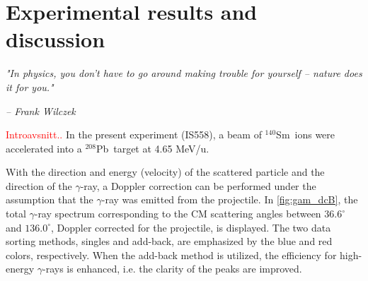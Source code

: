 \documentclass[twoside,english]{uiofysmaster/uiofysmaster}
\newcommand{\Sm}{$^{140}$Sm} %
\newcommand{\Pb}{$^{208}$Pb}
\newcommand{\ga}{$\gamma$}
\let\orgautoref\autoref
\renewcommand{\autoref}
        {%
		 \def\sectionautorefname{Section}%
		 \def\subsectionautorefname{Section}%
		 \def\subsubsectionautorefname{Section}%
		 \def\chapterautorefname{Chapter}%
          \orgautoref}
\begin{document}
%		
%		




\chapter{Experimental results and discussion}\label{ch:results}
\epigraph{\textit{"In physics, you don't have to go around making trouble for yourself – nature does it for you."}}{\textit{– Frank Wilczek}}


\textcolor{red}{Introavsnitt..}
In the present experiment (IS558), a beam of \Sm\ ions were accelerated into a \Pb\ target at 4.65 MeV/u.


With the direction and energy (velocity) of the scattered particle and the direction of the \ga-ray, a Doppler correction can be performed under the assumption that the \ga-ray was emitted from the projectile.
In \autoref{fig:gam_dcB}, the total \ga-ray spectrum corresponding to the CM scattering angles between $36.6^\circ$ and $136.0^\circ$, Doppler corrected for the projectile, is displayed.
The two data sorting methods, singles and add-back, are emphasized by the blue and red colors, respectively.
When the add-back method is utilized, the efficiency for high-energy \ga-rays is enhanced, i.e. the clarity of the peaks are improved.
\end{document}
